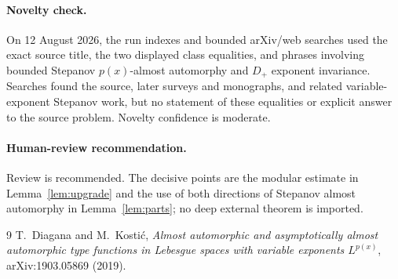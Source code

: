 \documentclass[10pt]{article}
\begin{document}
\paragraph{Novelty check.}
On 12 August 2026, the run indexes and bounded arXiv/web searches used the
exact source title, the two displayed class equalities, and phrases involving
bounded Stepanov $p(x)$-almost automorphy and $D_+$ exponent invariance.
Searches found the source, later surveys and monographs, and related
variable-exponent Stepanov work, but no statement of these equalities or
explicit answer to the source problem.  Novelty confidence is moderate.

\paragraph{Human-review recommendation.}
Review is recommended.  The decisive points are the modular estimate in
Lemma~\ref{lem:upgrade} and the use of both directions of Stepanov almost
automorphy in Lemma~\ref{lem:parts}; no deep external theorem is imported.

\begin{thebibliography}{9}
T.~Diagana and M.~Kosti\'c,
\emph{Almost automorphic and asymptotically almost automorphic type functions
in Lebesgue spaces with variable exponents $L^{p(x)}$},
arXiv:1903.05869 (2019).
\end{thebibliography}
\end{document}
